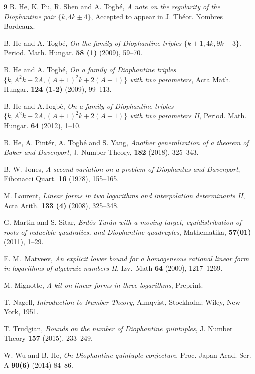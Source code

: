 \documentclass{amsart}
\theoremstyle{definition}
\begin{document}
\begin{thebibliography}{9}
 B. He, K. Pu, R. Shen and A. Togb\'e, \emph{A note on the regularity of the Diophantine pair $\{k,4k\pm 4\}$}, Accepted to appear in J. Th\' eor. Nombres Bordeaux.    

 B. He and A. Togb\'e, \emph{On the family of Diophantine triples $\{k+1, 4k, 9k+3\}$}. Period. Math. Hungar. \textbf{58 (1)} (2009), 59--70.

  B. He and A. Togb\'e, \emph{On a family of Diophantine triples $\{k, A^2k+2A ,(A+1)^2k+2(A+1)\}$ with two parameters}, Acta Math. Hungar. \textbf{124 (1-2)} (2009), 99--113.

 B. He and A.Togb\'e, \emph{On a family of Diophantine triples $\{k, A^2k+2A ,(A+1)^2k+2(A+1)\}$ with two parameters II}, Period. Math. Hungar. \textbf{64} (2012), 1--10.

  B. He,  A. Pint\'er, A. Togb\'e and S. Yang, \emph{Another generalization of a theorem of Baker and Davenport}, J. Number Theory, \textbf{182} (2018), 325--343.  

 B. W. Jones, \emph{A second variation on a problem of Diophantus and Davenport}, Fibonacci Quart. \textbf{16} (1978), 155--165.

  M. Laurent, \emph{Linear forms in two logarithms and interpolation determinants II}, Acta Arith. \textbf{133 (4)} (2008), 325--348.  

 G. Martin and S. Sitar, \emph{Erd\'os-Tur\'an with a moving target, equidistribution of roots of reducible quadratics, and Diophantine quadruples},  Mathematika, \textbf{57(01)} (2011), 1--29.

 E. M.~Matveev, \emph{An explicit lower bound for a homogeneous rational linear form in logarithms of algebraic numbers II}, Izv.~Math \textbf{64} (2000), 1217--1269.

 M. Mignotte, \emph{A kit on linear forms in three logarithms}, Preprint.

 T. Nagell, \emph{Introduction to Number Theory}, Almqvist, Stockholm; Wiley, New York, 1951.

 T.  Trudgian, \emph{Bounds on the number of Diophantine quintuples}, J. Number Theory \textbf{157} (2015), 233--249.

 W. Wu and B. He,  \emph{On Diophantine quintuple conjecture}. Proc.  Japan Acad. Ser. A  \textbf{90(6)} (2014) 84--86.

\end{thebibliography}
\end{document}

